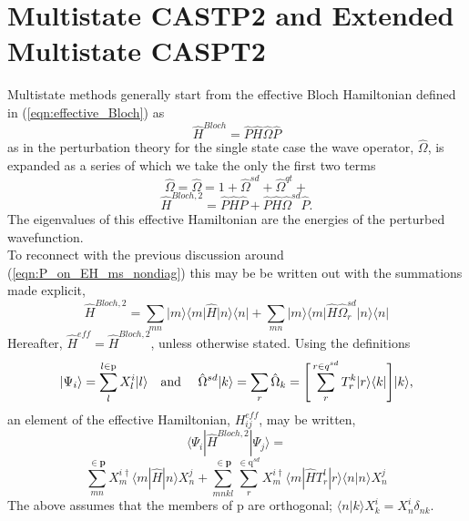 \section{Multistate CASTP2 and Extended Multistate CASPT2 }

\noindent Multistate methods generally start from the effective Bloch Hamiltonian defined in 
(\ref{eqn:effective_Bloch}) as 
\begin{equation}
\hat{H}^{Bloch} = \hat{P}\hat{H}\hat{\Omega}\hat{P}
\label{eqn:effective_Bloch_opform}
\end{equation}
as in the perturbation theory for the single state case the wave operator, $\hat{\Omega}$, is expanded as a series 
of which we take the only the first two terms
\begin{equation}
\hat{\Omega} =\hat{\Omega} =  1 + \hat{\Omega}^{sd}+ \hat{\Omega}^{qt}+ 
\end{equation}
\begin{equation}
\hat{H}^{Bloch,2} = \hat{P}\hat{H}\hat{P} +  \hat{P}\hat{H}\hat{\Omega}^{sd}\hat{P}.
\label{eqn:effective_Bloch_opform_secondorder}
\end{equation}
The eigenvalues of this effective Hamiltonian are the energies of the perturbed wavefunction.\\

\noindent To reconnect with the previous discussion around (\ref{eqn:P_on_EH_ms_nondiag}) this may be 
be written out with the summations made explicit,
\begin{equation}
\hat{H}^{Bloch,2} = 
\sum_{mn}|m\rangle\langle m | \hat{H} |n \rangle\langle n|+
\sum_{mn}|m\rangle\langle m | \hat{H}\hat{\Omega}^{sd}_{r} |n \rangle\langle n|
\label{eqn:effective_Bloch_summation_explicit}
\end{equation}
Hereafter, $ \hat{H}^{eff} =  \hat{H}^{Bloch,2} $, unless otherwise stated. Using the definitions 
\begin{equation}
|\Psi_{i}\rangle = \sum_{l}^{l \in \mathrm{p}} X_{l}^{i} | l \rangle
\text{\ \ \ and \ \ \ }
\hat{\Omega}^{sd}| k \rangle  = \sum_{r} \hat{\Omega}_{k} = \Bigg{[}\sum_{r}^{r \in q^{sd}} T^{k}_{r} |r\rangle\langle k |\Bigg{]} |  k \rangle,
\end{equation}
an element of the effective Hamiltonian, $H_{ij}^{eff}$, may be written,
\begin{equation*}
\langle \Psi_{i} | \hat{H}^{Bloch,2} | \Psi_{j} \rangle =
\end{equation*}
\begin{equation}
\sum_{mn}^{\in \mathbf{p}}
X^{i\dagger}_{m} \langle m | \hat{H} |n \rangle  X^{j}_{n}
+\sum_{mnkl}^{\in \mathbf{p} }\sum_{r}^{\in \mathrm{q}^{sd}}
X^{i\dagger}_{m}\langle m |
\hat{H} T^{l}_{r}
|r \rangle\langle n | n \rangle  X^{j}_{n}
\label{eqn:effective_Bloch_summation_explicit}
\end{equation}
The above assumes that the members of p are orthogonal; $\langle n | k \rangle X^{i}_{k} = X^{i}_{n}\delta_{nk}$. \\ 

